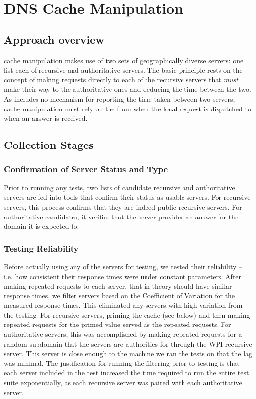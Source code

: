 \section{DNS Cache Manipulation}\label{sec:design_dns}

\subsection{Approach overview}
\dns cache manipulation makes use of two sets of geographically diverse \dns servers: one list each of recursive and authoritative servers. The basic principle rests on the concept of making requests directly to each of the recursive servers that \textit{must} make their way to the authoritative ones and deducing the time between the two. As \dns includes no mechanism for reporting the time taken between two servers, \dns cache manipulation must rely on the \rtt from when the local request is dispatched to when an answer is received.

\subsection{Collection Stages}\label{sec:dns_design_collection_stages}

\subsubsection{Confirmation of Server Status and Type} 
Prior to running any tests, two lists of candidate recursive and authoritative servers are fed into tools that confirm their status as usable servers. For recursive servers, this process confirms that they are indeed public recursive servers. For authoritative candidates, it verifies that the server provides an answer for the domain it is expected to.

\subsubsection{Testing Reliability}
Before actually using any of the servers for testing, we tested their reliability -- i.e. how consistent their response times were under constant parameters. After making repeated requests to each server, that in theory should have similar response times, we filter servers based on the Coefficient of Variation for the measured response times. This eliminated any servers with high variation from the testing. For recursive servers, priming the cache (see below) and then making repeated requests for the primed value served as the repeated requests. For authoritative servers, this was accomplished by making repeated requests for a random subdomain that the servers are authorities for through the WPI recursive \dns server. This server is close enough to the machine we ran the tests on that the lag was minimal. The justification for running the filtering prior to testing is that each server included in the test increased the time required to run the entire test suite exponentially, as each recursive server was paired with each authoritative server.

